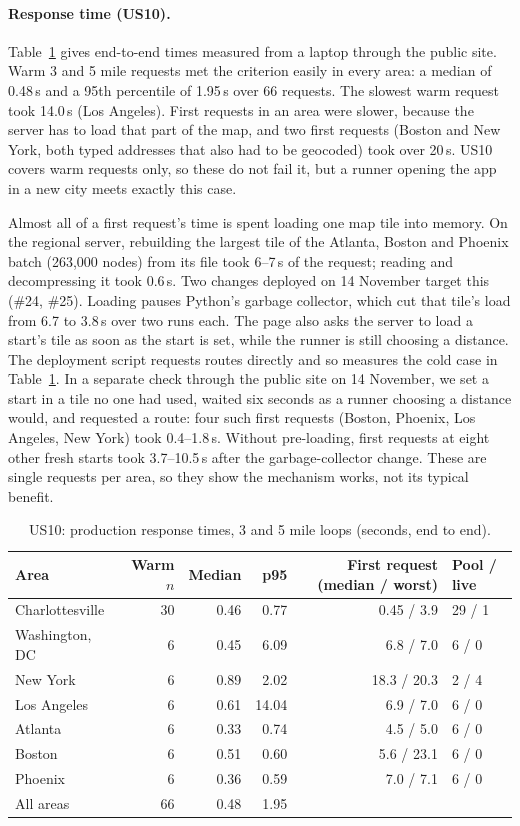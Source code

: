 \paragraph{Response time (US10).}
Table~\ref{tab:latency} gives end-to-end times measured from a laptop
through the public site. Warm 3 and 5 mile requests met the criterion easily
in every area: a median of 0.48\,s and a 95th percentile of 1.95\,s over 66
requests. The slowest warm request took 14.0\,s (Los Angeles). First requests
in an area were slower, because the server has to load that part of the map,
and two first requests (Boston and New York, both typed addresses that also
had to be geocoded) took over 20\,s. US10 covers warm requests only, so these
do not fail it, but a runner opening the app in a new city meets exactly this
case.

Almost all of a first request's time is spent loading one map tile into
memory. On the regional server, rebuilding the largest tile of the
Atlanta, Boston and Phoenix batch (263{,}000 nodes) from its file took 6--7\,s of the request; reading and
decompressing it took 0.6\,s. Two changes deployed on 14 November target this
(\#24, \#25). Loading pauses Python's garbage collector, which cut that tile's
load from 6.7 to 3.8\,s over two runs each. The page also asks the server to
load a start's tile as soon as the start is set, while the runner is still
choosing a distance. The deployment script requests routes directly and so
measures the cold case in Table~\ref{tab:latency}. In a separate check through
the public site on 14 November, we set a start in a tile no one had used,
waited six seconds as a runner choosing a distance would, and requested a
route: four such first requests (Boston, Phoenix, Los Angeles, New York) took
0.4--1.8\,s. Without pre-loading, first requests at eight other fresh starts
took 3.7--10.5\,s after the garbage-collector change. These are single
requests per area, so they show the mechanism works, not its typical
benefit.

\begin{table}[ht]
\centering\small
\caption{US10: production response times, 3 and 5 mile loops (seconds, end to end).}
\label{tab:latency}
\begin{tabular}{@{}l r r r r l@{}}
\toprule
Area & Warm $n$ & Median & p95 & First request (median / worst) & Pool / live \\
\midrule
Charlottesville & 30 & 0.46 & 0.77 & 0.45 / 3.9 & 29 / 1 \\
Washington, DC & 6 & 0.45 & 6.09 & 6.8 / 7.0 & 6 / 0 \\
New York & 6 & 0.89 & 2.02 & 18.3 / 20.3 & 2 / 4 \\
Los Angeles & 6 & 0.61 & 14.04 & 6.9 / 7.0 & 6 / 0 \\
Atlanta & 6 & 0.33 & 0.74 & 4.5 / 5.0 & 6 / 0 \\
Boston & 6 & 0.51 & 0.60 & 5.6 / 23.1 & 6 / 0 \\
Phoenix & 6 & 0.36 & 0.59 & 7.0 / 7.1 & 6 / 0 \\
\midrule
All areas & 66 & 0.48 & 1.95 & & \\
\bottomrule
\end{tabular}
\end{table}

